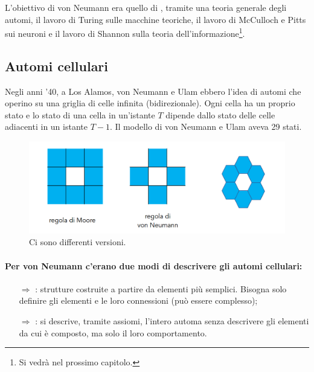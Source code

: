 L'obiettivo di von Neumann era quello di , tramite una
teoria generale degli automi, il lavoro di Turing sulle macchine teoriche,
il lavoro di McCulloch e Pitts sui neuroni e il lavoro di Shannon sulla
teoria dell'informazione\footnote{Si vedrà nel prossimo capitolo.}.


\subsection{Automi cellulari}

Negli anni '40, a Los Alamos, von Neumann e Ulam ebbero l'idea di
automi che operino su una griglia di celle infinita (bidirezionale).
Ogni cella ha un proprio stato e lo stato di una cella in un'istante $T$
dipende dallo stato delle celle adiacenti in un istante $T - 1$. Il modello
di von Neumann e Ulam aveva 29 stati.


\begin{figure}[h]
    \centering
    \includegraphics[scale = 0.3]{images/Automi cellulari.png}
    \caption{Ci sono differenti versioni.}
\end{figure}

\paragraph{Per von Neumann c'erano due modi di descrivere gli automi cellulari:}

\begin{itemize}
    \item [$\Rightarrow$] : strutture
    costruite a partire da elementi più semplici. Bisogna solo definire gli elementi e le loro connessioni (può essere complesso);
    \item [$\Rightarrow$] : si descrive, tramite assiomi, l'intero automa senza descrivere
    gli elementi da cui è composto, ma solo il loro comportamento.
\end{itemize}

